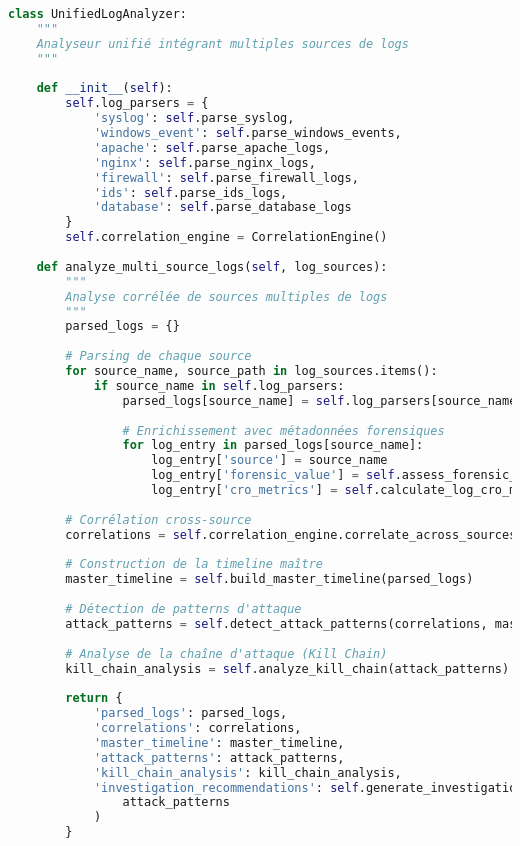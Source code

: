 \begin{lstlisting}[language=Python, caption=Analyseur unifié de logs avec corrélation intelligente]
class UnifiedLogAnalyzer:
    """
    Analyseur unifié intégrant multiples sources de logs
    """
    
    def __init__(self):
        self.log_parsers = {
            'syslog': self.parse_syslog,
            'windows_event': self.parse_windows_events,
            'apache': self.parse_apache_logs,
            'nginx': self.parse_nginx_logs,
            'firewall': self.parse_firewall_logs,
            'ids': self.parse_ids_logs,
            'database': self.parse_database_logs
        }
        self.correlation_engine = CorrelationEngine()
        
    def analyze_multi_source_logs(self, log_sources):
        """
        Analyse corrélée de sources multiples de logs
        """
        parsed_logs = {}
        
        # Parsing de chaque source
        for source_name, source_path in log_sources.items():
            if source_name in self.log_parsers:
                parsed_logs[source_name] = self.log_parsers[source_name](source_path)
                
                # Enrichissement avec métadonnées forensiques
                for log_entry in parsed_logs[source_name]:
                    log_entry['source'] = source_name
                    log_entry['forensic_value'] = self.assess_forensic_value(log_entry)
                    log_entry['cro_metrics'] = self.calculate_log_cro_metrics(log_entry)
                    
        # Corrélation cross-source
        correlations = self.correlation_engine.correlate_across_sources(parsed_logs)
        
        # Construction de la timeline maître
        master_timeline = self.build_master_timeline(parsed_logs)
        
        # Détection de patterns d'attaque
        attack_patterns = self.detect_attack_patterns(correlations, master_timeline)
        
        # Analyse de la chaîne d'attaque (Kill Chain)
        kill_chain_analysis = self.analyze_kill_chain(attack_patterns)
        
        return {
            'parsed_logs': parsed_logs,
            'correlations': correlations,
            'master_timeline': master_timeline,
            'attack_patterns': attack_patterns,
            'kill_chain_analysis': kill_chain_analysis,
            'investigation_recommendations': self.generate_investigation_recommendations(
                attack_patterns
            )
        }
    

\end{lstlisting}
